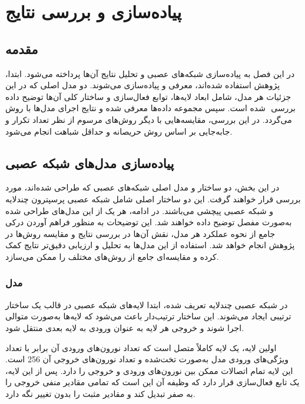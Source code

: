 \chapter{پیاده‌سازی و بررسی نتایج}

\section{مقدمه}
در این فصل به پیاده‌سازی شبکه‌های عصبی و تحلیل نتایج آن‌ها پرداخته می‌شود. ابتدا، دو مدل اصلی که در این ‎پژوهش استفاده شده‌اند، معرفی و پیاده‌سازی می‌شوند. جزئیات هر مدل، شامل ابعاد لایه‌ها، توابع فعال‌سازی و ساختار کلی آن‌ها توضیح داده شده است. 
سپس مجموعه داده‌ها معرفی شده و نتایج اجرای مدل‌ها با روش ‎‎ بررسی می‌گردد. در این بررسی، مقایسه‌هایی با دیگر روش‌های مرسوم از نظر تعداد تکرار و جابه‌جایی بر اساس روش حریصانه و حداقل شباهت انجام می‌شود.



\section{پیاده‌سازی مدل‌های شبکه عصبی}
در این بخش، دو ساختار و مدل اصلی شبکه‌های عصبی که طراحی شده‌اند، مورد بررسی قرار خواهند گرفت. این دو ساختار اصلی شامل شبکه عصبی پرسپترون چندلایه%
و شبکه عصبی پیچشی%
می‌باشند. در ادامه، هر یک از این مدل‌های طراحی شده به‌صورت مفصل توضیح داده خواهند شد. این توضیحات به منظور فراهم آوردن درکی جامع از نحوه عملکرد هر مدل، نقش آن‌ها در بررسی نتایج و مقایسه روش‌ها در پژوهش انجام خواهد شد. استفاده از این مدل‌ها به تحلیل و ارزیابی دقیق‌تر نتایج کمک کرده و مقایسه‌ای جامع از روش‌های مختلف را ممکن می‌سازد.

\subsection{
	مدل
}
در شبکه عصبی چندلایه تعریف شده، ابتدا لایه‌های شبکه عصبی در قالب یک ساختار ترتیبی%
ایجاد می‌شوند. این ساختار ترتیب‌دار باعث می‌شود که لایه‌ها به‌صورت متوالی اجرا شوند و خروجی هر لایه به عنوان ورودی به لایه بعدی منتقل شود.

اولین لایه، یک لایه کاملاً متصل است که تعداد نورون‌های ورودی آن برابر با تعداد ویژگی‌های ورودی مدل به‌صورت تخت‌شده و تعداد نورون‌های خروجی آن 256 است. این لایه تمام اتصالات ممکن بین نورون‌های ورودی و خروجی را دارد. پس از این لایه، یک تابع فعال‌سازی 
قرار دارد که وظیفه آن این است که تمامی مقادیر منفی خروجی را به صفر تبدیل کند و مقادیر مثبت را بدون تغییر نگه دارد.

